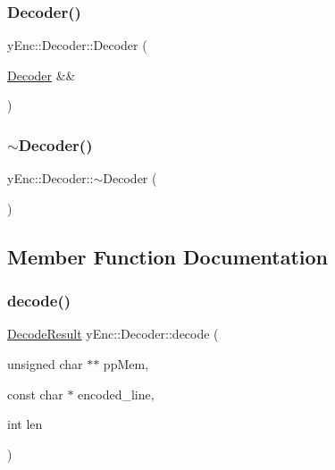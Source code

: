 \hypertarget{classy_enc_1_1_decoder_aa1a82a03f753c52a583e3b9a396e2c2f}{}\label{classy_enc_1_1_decoder_aa1a82a03f753c52a583e3b9a396e2c2f} 
\subsubsection{\texorpdfstring{Decoder()}{Decoder()}\hspace{0.1cm}{\footnotesize\ttfamily [3/3]}}
{\footnotesize\ttfamily y\+Enc\+::\+Decoder\+::\+Decoder (\begin{DoxyParamCaption}\item[{\hyperlink{classy_enc_1_1_decoder}{Decoder} \&\&}]{ }\end{DoxyParamCaption})\hspace{0.3cm}{\ttfamily [default]}}

\hypertarget{classy_enc_1_1_decoder_a8e021ad88e0aaef585e4a6a0ed120467}{}\label{classy_enc_1_1_decoder_a8e021ad88e0aaef585e4a6a0ed120467} 
\subsubsection{\texorpdfstring{$\sim$\+Decoder()}{~Decoder()}}
{\footnotesize\ttfamily y\+Enc\+::\+Decoder\+::$\sim$\+Decoder (\begin{DoxyParamCaption}{ }\end{DoxyParamCaption})\hspace{0.3cm}{\ttfamily [virtual]}}



\subsection{Member Function Documentation}
\hypertarget{classy_enc_1_1_decoder_ab576e3517c991fba3030cfb4edf2b735}{}\label{classy_enc_1_1_decoder_ab576e3517c991fba3030cfb4edf2b735} 
\subsubsection{\texorpdfstring{decode()}{decode()}\hspace{0.1cm}{\footnotesize\ttfamily [1/2]}}
{\footnotesize\ttfamily \hyperlink{namespacey_enc_a6e002c8cbde1ad4f0f425b0b2b62c7ff}{Decode\+Result} y\+Enc\+::\+Decoder\+::decode (\begin{DoxyParamCaption}\item[{unsigned char $\ast$$\ast$}]{pp\+Mem,  }\item[{const char $\ast$}]{encoded\+\_\+line,  }\item[{int}]{len }\end{DoxyParamCaption})}

